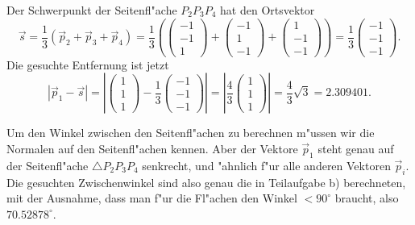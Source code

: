 \begin{loesung}
\begin{teilaufgaben}
\item
Der Schwerpunkt der Seitenfl"ache $P_2P_3P_4$ hat den Ortsvektor
\[
\vec s=\frac13(\vec p_2+\vec p_3+\vec p_4)
=
\frac13\left(
\begin{pmatrix}-1\\-1\\ 1\end{pmatrix}+
\begin{pmatrix}-1\\ 1\\-1\end{pmatrix}+
\begin{pmatrix} 1\\-1\\-1\end{pmatrix}
\right)
=\frac13
\begin{pmatrix} -1\\-1\\-1 \end{pmatrix}.
\]
Die gesuchte Entfernung ist jetzt
\[
|\vec p_1-\vec s|
=
\left|
\begin{pmatrix}1\\1\\1\end{pmatrix}
-
\frac13\begin{pmatrix} -1\\-1\\-1 \end{pmatrix}
\right|
=
\left|
\frac43\begin{pmatrix}1\\1\\1\end{pmatrix}
\right|
=\frac43\sqrt{3}=2.309401.
\]
\item
Um den Winkel zwischen den Seitenfl"achen zu berechnen m"ussen wir die 
Normalen auf den Seitenfl"achen kennen. Aber der Vektore $\vec p_1$ steht
genau auf der Seitenfl"ache $\triangle P_2P_3P_4$ senkrecht, und "ahnlich
f"ur alle anderen Vektoren $\vec p_i$. Die gesuchten Zwischenwinkel
sind also genau die in Teilaufgabe b) berechneten, mit der Ausnahme, dass
man f"ur die Fl"achen den Winkel $<90^\circ$ braucht, also $70.52878^\circ$.
\end{teilaufgaben}
\end{loesung}
